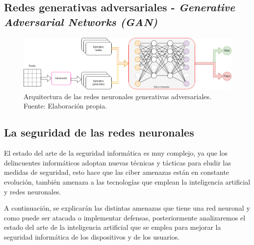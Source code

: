\subsection{Redes generativas adversariales - \textit{Generative Adversarial Networks (GAN)}}
\begin{figure}[H]
    \centering
    \includegraphics[width=1\textwidth]{figures/chapter02/GANs.drawio.png}
    \caption{Arquitectura de las redes neuronales generativas adversariales.\\Fuente: Elaboración propia.}
    \label{fig:gans-architecture}
\end{figure}



\subsection{La seguridad de las redes neuronales}
\label{ch:2:section:state-of-the-art:computer-security-in-neural-networks}


El estado del arte de la seguridad informática es muy complejo, ya que los delincuentes informáticos adoptan nuevas técnicas y tácticas para eludir las medidas de seguridad, esto hace que las ciber amenazas están en constante evolución, también amenaza a las tecnologías que emplean la inteligencia artificial y redes neuronales.

A continuación, se explicarán las distintas amenazas que tiene una red neuronal y como puede ser atacada o implementar defensas, posteriormente analizaremos el estado del arte de la inteligencia artificial que se emplea para mejorar la seguridad informática de los dispositivos y de los usuarios.

